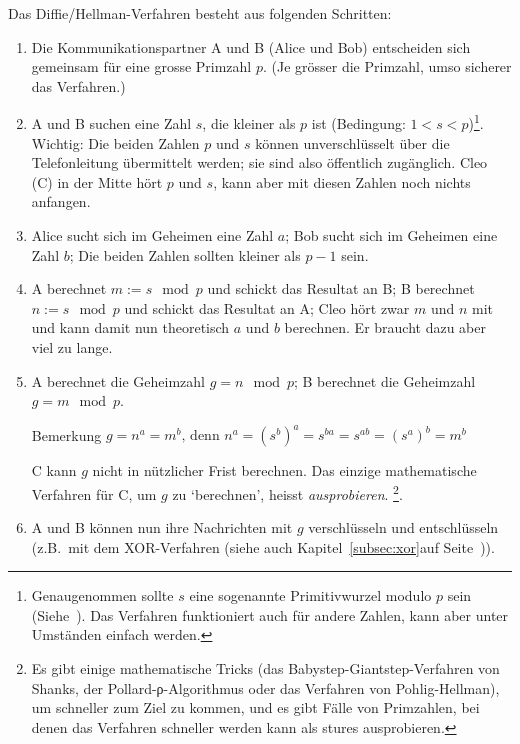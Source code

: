 Das Diffie/Hellman-Verfahren besteht aus folgenden Schritten:
\begin{enumerate}
    \item Die Kommunikationspartner A und B (Alice und Bob) entscheiden sich
    gemeinsam für eine grosse Primzahl $p$. (Je grösser die Primzahl, umso
    sicherer das Verfahren.)

    \item A und B suchen eine Zahl $s$, die kleiner als $p$ ist
    (Bedingung: $1 < s < p$)\footnote{Genaugenommen sollte $s$ eine sogenannte
    Primitivwurzel modulo $p$ sein (Siehe~\cite{buchmann}). Das Verfahren
    funktioniert auch für andere Zahlen, kann aber unter Umständen einfach werden.}.
    Wichtig: Die beiden Zahlen $p$ und $s$ können unverschlüsselt über die
    Telefonleitung übermittelt werden; sie sind also öffentlich zugänglich.
    Cleo (C) in der Mitte hört $p$ und $s$, kann aber mit diesen Zahlen
    noch nichts anfangen.

    \item Alice sucht sich im Geheimen eine Zahl $a$; Bob sucht sich im Geheimen
    eine Zahl $b$; Die beiden Zahlen sollten kleiner als $p − 1$ sein.

    \item A berechnet $m := s \mod p$ und schickt das Resultat an B;
    B berechnet $n := s \mod p$ und schickt das Resultat an A;
    Cleo hört zwar $m$ und $n$ mit und kann damit nun theoretisch $a$ und $b$
    berechnen. Er braucht dazu aber viel zu lange.

    \item A berechnet die Geheimzahl $g = n \mod p$;
    B berechnet die Geheimzahl $g = m \mod p$.

    Bemerkung $g = n^a = m^b \text{, denn } n^a = {(s^b)}^a = s^{ba} = s^{ab} = {(s^a)}^b = m^b$

    C kann $g$ nicht in nützlicher Frist berechnen. Das einzige mathematische Verfahren für C,
    um $g$ zu `berechnen', heisst \emph{ausprobieren}.
    \footnote{Es gibt einige mathematische Tricks (das Babystep-Giantstep-Verfahren von
    Shanks, der Pollard-ρ-Algorithmus oder das Verfahren von Pohlig-Hellman), um schneller
    zum Ziel zu kommen, und es gibt Fälle von Primzahlen, bei denen das Verfahren schneller
    werden kann als stures ausprobieren.}.

    \item A und B können nun ihre Nachrichten mit $g$ verschlüsseln und entschlüsseln
    (z.B.~mit dem XOR-Verfahren (siehe auch Kapitel~\ref{subsec:xor}auf Seite~\pageref{subsec:xor})).
\end{enumerate}

